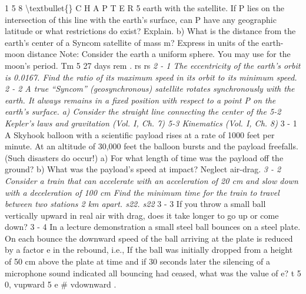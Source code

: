 \documentclass[10pt,oneside]{article}
\begin{document}
1 5 8 \textbackslash{}textbullet\{\} C H A P T E R  5 earth with the satellite. If P lies on the intersection of this line with the earth’s surface, can P have any geographic latitude or what restrictions do exist? Explain. b) What is the distance from the earth’s center of a Syncom satellite of mass m? Express in units of the earth-moon distance Note: Consider the earth a uniform sphere. You may use for the moon’s period. Tm 5 27 days rem . rs rs \emph{ 2 - 1 The eccentricity of the earth’s orbit is 0.0167. Find the ratio of its maximum speed in its orbit to its minimum speed. } \emph{ 2 - 2 A true “Syncom” (geosynchronous) satellite rotates synchronously with the earth. It always remains in a fixed position with respect to a point P on the earth’s surface. a) Consider the straight line connecting the center of the 5-2 Kepler’s laws and gravitation (Vol. I, Ch. 7) 5-3 Kinematics (Vol. I, Ch. 8) } 3 - 1 A Skyhook balloon with a scientific payload rises at a rate of 1000 feet per minute. At an altitude of 30,000 feet the balloon bursts and the payload freefalls. (Such disasters do occur!) a) For what length of time was the payload off the ground? b) What was the payload’s speed at impact? Neglect air-drag. \emph{ 3 - 2 Consider a train that can accelerate with an acceleration of 20 cm and slow down with a deceleration of 100 cm Find the minimum time for the train to travel between two stations 2 km apart. s22. s22 } 3 - 3 If you throw a small ball vertically upward in real air with drag, does it take longer to go up or come down? \emph{ } 3 - 4 In a lecture demonstration a small steel ball bounces on a steel plate. On each bounce the downward speed of the ball arriving at the plate is reduced by a factor e in the rebound, i.e., If the ball was initially dropped from a height of 50 cm above the plate at time and if 30 seconds later the silencing of a microphone sound indicated all bouncing had ceased, what was the value of e? t 5 0, vupward 5 e \# vdownward .\par
\end{document}
